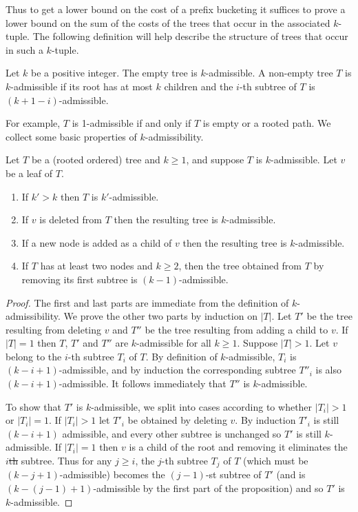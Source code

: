 \documentclass[unicode,review]{siamart1116}
\numberwithin{theorem}{section}
\providecommand{\DIFadd}[1]{{\protect\color{blue}\uwave{#1}}} %
\providecommand{\DIFdel}[1]{{\protect\color{red}\sout{#1}}}                      %
\providecommand{\DIFaddbegin}{} %
\providecommand{\DIFaddend}{} %
\providecommand{\DIFdelbegin}{} %
\providecommand{\DIFdelend}{} %
\newcommand{\DIFscaledelfig}{0.5}
\newlength{\DIFdelgraphicswidth} %
\newlength{\DIFdelgraphicsheight} %
\newcommand{\DIFaddincludegraphics}[2][]{{\color{blue}\fbox{\DIFOincludegraphics[#1]{#2}}}} %
\newcommand{\DIFdelincludegraphics}[2][]{%
\sbox{\DIFdelgraphicsbox}{\DIFOincludegraphics[#1]{#2}}%
\settoboxwidth{\DIFdelgraphicswidth}{\DIFdelgraphicsbox} %
\settoboxtotalheight{\DIFdelgraphicsheight}{\DIFdelgraphicsbox} %
\scalebox{\DIFscaledelfig}{%
\parbox[b]{\DIFdelgraphicswidth}{\usebox{\DIFdelgraphicsbox}\\[-\baselineskip] \rule{\DIFdelgraphicswidth}{0em}}\llap{\resizebox{\DIFdelgraphicswidth}{\DIFdelgraphicsheight}{%
\setlength{\unitlength}{\DIFdelgraphicswidth}%
\begin{picture}(1,1)%
\thicklines\linethickness{2pt} %
{\color[rgb]{1,0,0}\put(0,0){\framebox(1,1){}}}%
{\color[rgb]{1,0,0}\put(0,0){\line( 1,1){1}}}%
{\color[rgb]{1,0,0}\put(0,1){\line(1,-1){1}}}%
\end{picture}%
}\hspace*{3pt}}} %
} %
\DeclareRobustCommand{\DIFaddbegin}{\DIFOaddbegin \let\includegraphics\DIFaddincludegraphics} %
\DeclareRobustCommand{\DIFaddend}{\DIFOaddend \let\includegraphics\DIFOincludegraphics} %
\DeclareRobustCommand{\DIFdelbegin}{\DIFOdelbegin \let\includegraphics\DIFdelincludegraphics} %
\DeclareRobustCommand{\DIFdelend}{\DIFOaddend \let\includegraphics\DIFOincludegraphics} %
\begin{document}
Thus to get a lower bound on the cost of a prefix bucketing 
it suffices to prove a lower bound on the sum of the costs of
the trees that occur in the associated $k$-tuple. 
The following definition will help describe the structure of
trees that occur in such a $k$-tuple.

\begin{definition}[$k$-admissible]
\label{def:k-admissibility}
Let $k$ be a positive integer. 
The empty tree is $k$-admissible. A non-empty tree $T$ is $k$-admissible if its root has at most $k$ children
and the $i$-th  subtree of $T$ is $(k+1-i)$-admissible.
\end{definition}

For example, $T$ is 1-admissible if and only if $T$ is empty or a rooted path.
We collect some basic properties of $k$-admissibility.

\begin{proposition}
\label{lm:k-admissibility}
Let $T$ be a (rooted ordered) tree and $k \geq 1$, and suppose $T$ is $k$-admissible. Let $v$ be a leaf of $T$.
\begin{enumerate}
\item If  $k' > k$ then $T$ is $k'$-admissible.
\item If $v$ is deleted from $T$ then the resulting tree  is  $k$-admissible. 
\item If a new node is added as a child of $v$  then the resulting tree is $k$-admissible.
\item  If $T$ has at least two nodes and $k \geq 2$, 
then the tree obtained from $T$ by removing its first subtree is $(k-1)$-admissible.
\end{enumerate}
\end{proposition}
\begin{proof}
The first and last parts are  immediate from the definition of $k$-admissibility.
We prove the other two parts by induction on $|T|$. 
 Let $T'$ be the tree resulting from deleting $v$
and $T''$ be the tree resulting from adding a child to $v$.  If $|T|=1$ then  $T$, $T'$ and $T''$
are $k$-admissible for all $k \geq 1$.
Suppose $|T| > 1$.  Let $v$ belong to the $i$-th subtree $T_i$ of $T$.
By definition of $k$-admissible, $T_i$ is $(k-i+1)$-admissible, and by induction the corresponding
subtree $T''_i$ is also $(k-i+1)$-admissible.  It follows immediately that $T''$ is $k$-admissible.

To show that $T'$ is $k$-admissible, we split into cases according to whether $|T_i|>1$ or $|T_i|=1$.
If $|T_i|>1$ let $T'_i$ be obtained by deleting $v$.   By induction $T'_i$ is still $(k-i+1)$ admissible,
and every other subtree is unchanged so $T'$ is still $k$-admissible.  
If $|T_i|=1$ then $v$ is a child of the root and removing it eliminates the $i$\DIFdelbegin \DIFdel{th }\DIFdelend \DIFaddbegin \DIFadd{-th }\DIFaddend subtree. Thus for any $j \geq i$, 
the $j$-th subtree $T_j$
of $T$ (which must be $(k-j+1)$-admissible) becomes the $(j-1)$-st subtree of $T'$ (and is $(k-(j-1)+1)$-admissible 
by the first part of the proposition) and so $T'$ is $k$-admissible. 
\end{proof}
\end{document}
